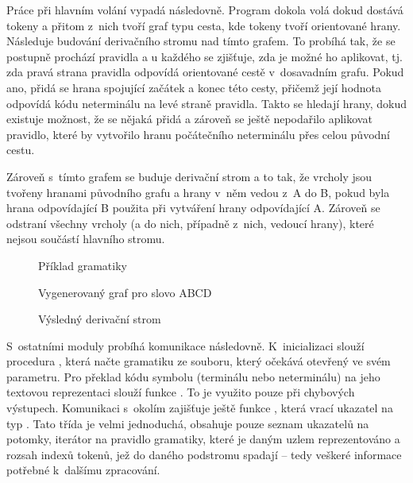 Práce při hlavním volání vypadá následovně. Program dokola volá
 dokud dostává tokeny a přitom z~nich tvoří graf typu cesta,
kde tokeny tvoří orientované hrany. Následuje budování derivačního stromu nad
tímto grafem. To probíhá tak, že se postupně prochází pravidla a u každého se
zjišťuje, zda je možné ho aplikovat, tj. zda pravá strana pravidla odpovídá
orientované cestě v~dosavadním grafu. Pokud ano, přidá se hrana spojující
začátek a konec této cesty, přičemž její hodnota odpovídá kódu neterminálu na
levé straně pravidla. Takto se hledají hrany, dokud existuje možnost, že se
nějaká přidá a zároveň se ještě nepodařilo aplikovat pravidlo, které by
vytvořilo hranu počátečního neterminálu přes celou původní cestu.

Zároveň s~tímto grafem se buduje derivační strom a to tak, že vrcholy jsou
tvořeny hranami původního grafu a hrany v~něm vedou z~A do B, pokud byla hrana
odpovídající B použita při vytváření hrany odpovídající A. Zároveň se odstraní
všechny vrcholy (a do nich, případně z~nich, vedoucí hrany), které nejsou
součástí hlavního stromu.

\begin{figure}[h]
	\caption{Příklad gramatiky}
\end{figure}

\begin{figure}[h]
	\caption{Vygenerovaný graf pro slovo ABCD}
\end{figure}

\begin{figure}[h]
	\caption{Výsledný derivační strom}
\end{figure}

S~ostatními moduly probíhá komunikace následovně. K~inicializaci slouží
procedura , která načte gramatiku ze souboru, který
očekává otevřený ve svém parametru. Pro překlad kódu symbolu (terminálu nebo
neterminálu) na jeho textovou reprezentaci slouží funkce .
To je využito pouze při chybových výstupech. Komunikaci s~okolím zajišťuje ještě
funkce , která vrací ukazatel na typ .
Tato třída je velmi jednoduchá, obsahuje pouze seznam ukazatelů na potomky,
iterátor na pravidlo gramatiky, které je daným uzlem reprezentováno a rozsah
indexů tokenů, jež do daného podstromu spadají -- tedy veškeré informace potřebné
k~dalšímu zpracování.

